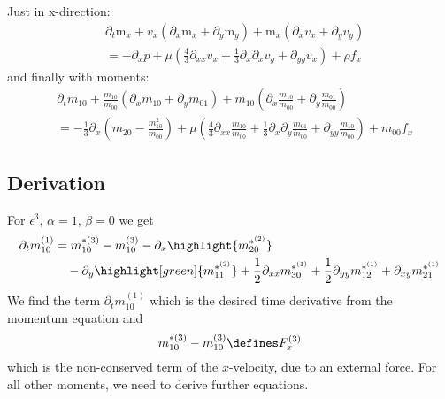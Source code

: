 Just in x-direction:
\begin{equation}
  \begin{aligned}
    & \partial_t \text{m}_x
    + v_x (\partial_x \text{m}_x + \partial_y \text{m}_y)
    + \text{m}_x (\partial_x v_x + \partial_y v_y)  \\
    & =
     - \partial_x p
     + \mu \left(\frac{4}{3}\partial_{xx}v_x
            + \frac{1}{3}\partial_x\partial_x v_y
            + \partial_{yy} v_x \right)  + \rho f_x
  \end{aligned}
\end{equation}
and finally with moments:
\begin{equation}
  \begin{aligned}
    & \partial_t m_{10}
    + \frac{m_{10}}{m_{00}} (\partial_x m_{10} + \partial_y m_{01})
    + m_{10} (\partial_x \frac{m_{10}}{m_{00}} + \partial_y \frac{m_{01}}{m_{00}})  \\
    & =
    - \frac{1}{3} \partial_x \left(m_{20} - \frac{ m_{10}^2 }{ m_{00} } \right)
     + \mu \left(\frac{4}{3}\partial_{xx}\frac{m_{10}}{m_{00}}
            + \frac{1}{3}\partial_x\partial_y \frac{m_{01}}{m_{00}}
            + \partial_{yy} \frac{m_{10}}{m_{00}} \right) + m_{00}f_x
  \end{aligned}
\end{equation}

\subsection{Derivation}
\label{sub:Derivation of momentum equation}

For $\epsilon^3$, $\alpha=1$, $\beta=0$ we get
\begin{equation}
  \label{eq: start of momentum equation derivation}
  \begin{aligned}
     \partial_t m_{10}^{(1)} & =
    m_{10}^{*(3)} - m_{10}^{(3)} - \partial_x \highlight{m_{20}^{*^{(2)}}} \\
    &\quad - \partial_y \highlight[green]{m_{11}^{*^{(2)}}} + \frac{1}{2}\partial_{xx} m_{30}^{*^{(1)}} + \frac{1}{2} \partial_{yy} m_{12}^{*^{(1)}} + \partial_{xy} m_{21}^{*^{(1)}}
  \end{aligned}
\end{equation}
We find the term $\partial_t m_{10}^{(1)} $ which is the desired time derivative from the momentum equation and
\begin{equation}
  m_{10}^{*(3)} - m_{10}^{(3)}\defines F_x^{(3)}
\end{equation}
 which is the non-conserved term of the $x$-velocity, due to an external force. For all other moments, we need to derive further equations.

